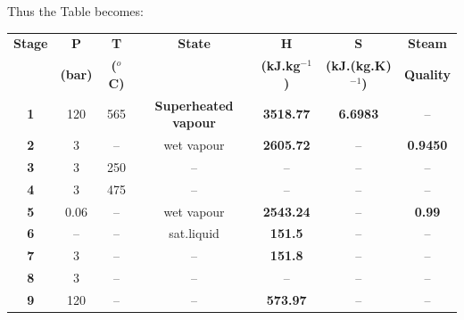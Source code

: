 \documentclass[calculator,steamtables,refrigeranttables,psychrometricchart,datasheet,solutions]{exam}
\begin{document}
\begin{question}
\begin{enumerate}[(a)]
{Thus the Table becomes:
\begin{center}
\begin{tabular} {||c | c c c c c c || }
\hline\hline
{\bf Stage} & {\bf P}    & {\bf T}        & {\bf State}    & {\bf H}             & {\bf S}                  & {\bf Steam}\\
            & {\bf (bar)}& {\bf ($^{o}$C)} &               & {\bf (kJ.kg$^{-1}$)} & {\bf (kJ.(kg.K)$^{-1}$)}  & {\bf Quality}\\
\hline\hline
 {\bf 1 }   & 120        & 565            &{\bf Superheated vapour}&{\bf 3518.77}&{\bf 6.6983}              & --          \\
 {\bf 2 }   & 3          &  --            &   wet vapour   &{\bf 2605.72}        &   --                     & {\bf 0.9450}   \\
 {\bf 3 }   & 3          & 250            &   --           & --                  & --                       & --           \\
 {\bf 4 }   & 3          & 475            &   --           & --                  & --                       & --            \\
 {\bf 5 }   & 0.06       & --             &   wet vapour   & {\bf 2543.24}       & --                       & {\bf 0.99}     \\
 {\bf 6 }   & --         & --             &   sat.liquid   & {\bf 151.5}         & --                       & -- \\
 {\bf 7 }   & 3          & --             &   --           & {\bf 151.8}         & --                       & --     \\
 {\bf 8 }   & 3          & --             &   --           & --                  & --                       & --           \\
 {\bf 9 }   & 120        & --             &   --           & {\bf 573.97}        &  --                      & -- \\
\hline\hline
\end{tabular}
\end{center}
}


\end{enumerate}
\end{question}
\end{document}

